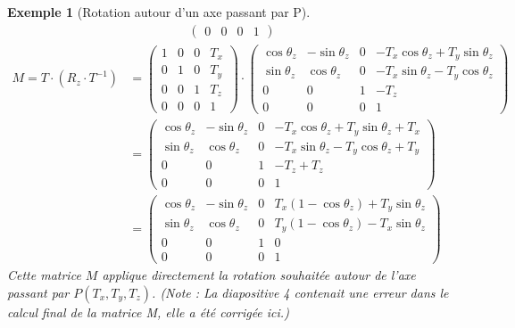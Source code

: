 \documentclass{article}
\newtheorem{example}{Exemple}
\begin{document}
\begin{example}[Rotation autour d'un axe passant par P]
\begin{align*}
\begin{pmatrix}
0 & 0 & 0 & 1
\end{pmatrix}
\end{align*}
\begin{align*}
M = T \cdot (R_z \cdot T^{-1}) &= \begin{pmatrix} 1 & 0 & 0 & T_x \\ 0 & 1 & 0 & T_y \\ 0 & 0 & 1 & T_z \\ 0 & 0 & 0 & 1 \end{pmatrix} \cdot \begin{pmatrix}
\cos\theta_z & -\sin\theta_z & 0 & -T_x \cos\theta_z + T_y \sin\theta_z \\
\sin\theta_z & \cos\theta_z & 0 & -T_x \sin\theta_z - T_y \cos\theta_z \\
0 & 0 & 1 & -T_z \\
0 & 0 & 0 & 1
\end{pmatrix} \\
&= \begin{pmatrix}
\cos\theta_z & -\sin\theta_z & 0 & -T_x \cos\theta_z + T_y \sin\theta_z + T_x \\
\sin\theta_z & \cos\theta_z & 0 & -T_x \sin\theta_z - T_y \cos\theta_z + T_y \\
0 & 0 & 1 & -T_z + T_z \\
0 & 0 & 0 & 1
\end{pmatrix} \\
&= \begin{pmatrix}
\cos\theta_z & -\sin\theta_z & 0 & T_x(1-\cos\theta_z) + T_y \sin\theta_z \\
\sin\theta_z & \cos\theta_z & 0 & T_y(1-\cos\theta_z) - T_x \sin\theta_z \\
0 & 0 & 1 & 0 \\
0 & 0 & 0 & 1
\end{pmatrix}
\end{align*}
Cette matrice $M$ applique directement la rotation souhaitée autour de l'axe passant par $P(T_x, T_y, T_z)$.
(Note : La diapositive 4 contenait une erreur dans le calcul final de la matrice M, elle a été corrigée ici.)
\end{example}
\end{document}

